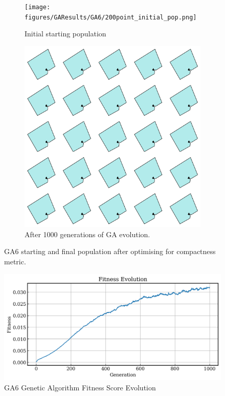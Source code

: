 \documentclass{article}
\begin{document}
\begin{figure}[H]
    \centering
    \begin{subfigure}[b]{0.45\textwidth}
        \centering
        \texttt{[image: figures/GAResults/GA6/200point\_initial\_pop.png]}
        \caption{Initial starting population}
        \label{fig:GA6_starting}
    \end{subfigure}
    \hfill
    \begin{subfigure}[b]{0.45\textwidth}
        \centering
        \includegraphics[width=\textwidth]{figures/GAResults/GA6/1000gens_4pars_100initpop_5pcent_mut.png}
        \caption{After 1000 generations of GA evolution.}
        \label{fig:GA6_final}
    \end{subfigure}
    \caption{GA6 starting and final population after optimising for compactness metric.}
    \label{fig:GA6_before_after_GA}
\end{figure}

\begin{figure}[H]
    \centering
    \includegraphics[width=0.75\linewidth]{figures/GAResults/GA6/fitness_curve.png}
    \caption{GA6 Genetic Algorithm Fitness Score Evolution}
    \label{fig:GA6_fitness}
\end{figure}
\end{document}
